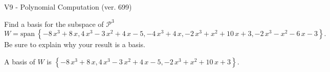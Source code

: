 \begin{exercise}
  \begin{exerciseTitle}V9 - Polynomial Computation (ver. 699)\end{exerciseTitle}
  \begin{exerciseStatement}
    Find a basis for the subspace of \(\mathcal{P}^3\) 
\[W=\mathrm{span}\ \left\{-8 \, x^{3} + 8 \, x , 4 \, x^{3} - 3 \, x^{2} + 4 \, x - 5 , -4 \, x^{3} + 4 \, x , -2 \, x^{3} + x^{2} + 10 \, x + 3 , -2 \, x^{3} - x^{2} - 6 \, x - 3\right\}.\]
 Be sure to explain why your result is a basis.


  \end{exerciseStatement}
  \begin{exerciseAnswer}
   A basis of \(W\) is  \(\left\{-8 \, x^{3} + 8 \, x , 4 \, x^{3} - 3 \, x^{2} + 4 \, x - 5 , -2 \, x^{3} + x^{2} + 10 \, x + 3\right\}\).
  


  \end{exerciseAnswer}
\end{exercise}